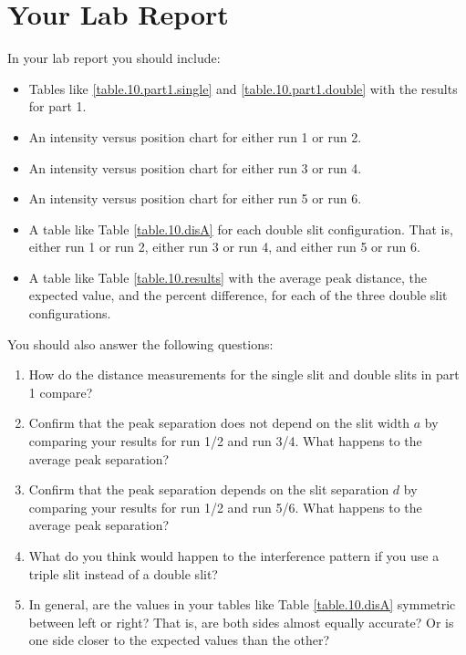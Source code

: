 \section{Your Lab Report}
In your lab report you should include:
\begin{itemize}
	\item Tables like \ref{table.10.part1.single} and \ref{table.10.part1.double} with the results for part 1.
	\item An intensity versus position chart for either run 1 or run 2.
	\item An intensity versus position chart for either run 3 or run 4.
	\item An intensity versus position chart for either run 5 or run 6.
	\item A table like Table \ref{table.10.disA} for each double slit configuration. That is, either run 1 or run 2, either run 3 or run 4, and either run 5 or run 6.
	\item A table like Table \ref{table.10.results} with the average peak distance, the expected value, and the percent difference, for each of the three double slit configurations.
\end{itemize}
You should also answer the following questions:
\begin{enumerate}
	\item How do the distance measurements for the single slit and double slits in part 1 compare?
	\item Confirm that the peak separation does not depend on the slit width $a$ by comparing your results for run 1/2 and run 3/4. What happens to the average peak separation?
	\item Confirm that the peak separation depends on the slit separation $d$ by comparing your results for run 1/2 and run 5/6. What happens to the average peak separation?
	\item What do you think would happen to the interference pattern if you use a triple slit instead of a double slit?
	\item In general, are the values in your tables like Table \ref{table.10.disA} symmetric between left or right? That is, are both sides almost equally accurate? Or is one side closer to the expected values than the other?
\end{enumerate}
\newpage
